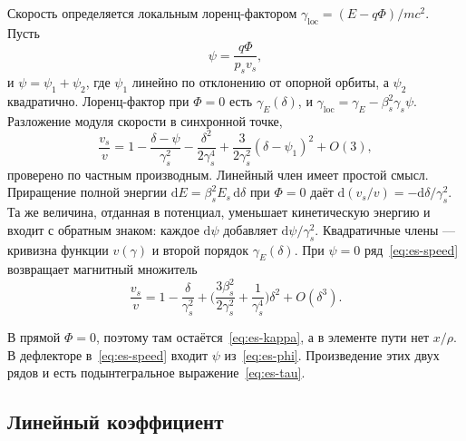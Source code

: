 Скорость определяется локальным лоренц-фактором $\gamma_{\mathrm{loc}}=(E-q\Phi)/mc^2$. Пусть
\begin{equation}
\label{eq:es-psi}
\psi=\frac{q\Phi}{p_s v_s},
\end{equation}
и $\psi=\psi_1+\psi_2$, где $\psi_1$ линейно по отклонению от опорной орбиты, а $\psi_2$ квадратично. Лоренц-фактор при $\Phi=0$ есть $\gamma_E(\delta)$, и $\gamma_{\mathrm{loc}}=\gamma_E-\beta_s^2\gamma_s\psi$. Разложение модуля скорости в синхронной точке,
\begin{equation}
\label{eq:es-speed}
\frac{v_s}{v}
=1-\frac{\delta-\psi}{\gamma_s^2}-\frac{\delta^2}{2\gamma_s^4}
+\frac{3}{2\gamma_s^2}(\delta-\psi_1)^2+O(3),
\end{equation}
проверено по частным производным. Линейный член имеет простой смысл. Приращение полной энергии $\mathrm{d}E=\beta_s^2 E_s\,\mathrm{d}\delta$ при $\Phi=0$ даёт $\mathrm{d}(v_s/v)=-\mathrm{d}\delta/\gamma_s^2$. Та же величина, отданная в потенциал, уменьшает кинетическую энергию и входит с обратным знаком: каждое $\mathrm{d}\psi$ добавляет $\mathrm{d}\psi/\gamma_s^2$. Квадратичные члены --- кривизна функции $v(\gamma)$ и второй порядок $\gamma_E(\delta)$. При $\psi=0$ ряд~\eqref{eq:es-speed} возвращает магнитный множитель
\begin{equation}
\label{eq:es-kappa}
\frac{v_s}{v}
=1-\frac{\delta}{\gamma_s^2}
+\Biggl(\frac{3\beta_s^2}{2\gamma_s^2}+\frac{1}{\gamma_s^4}\Biggr)\delta^2+O(\delta^3).
\end{equation}

В прямой $\Phi=0$, поэтому там остаётся~\eqref{eq:es-kappa}, а в элементе пути нет $x/\rho$. В дефлекторе в~\eqref{eq:es-speed} входит $\psi$ из~\eqref{eq:es-phi}. Произведение этих двух рядов и есть подынтегральное выражение~\eqref{eq:es-tau}.

\subsection{Линейный коэффициент}
\label{sec:es-eta0}


